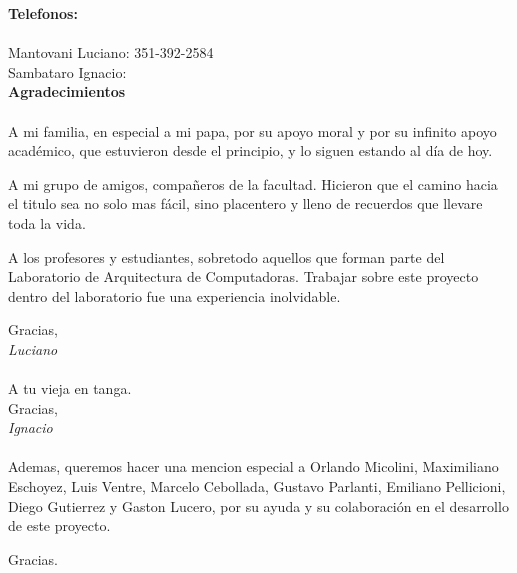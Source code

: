 \documentclass[a4paper]{report}
\begin{document}
\clearpage

\noindent
\textbf{\large{Telefonos:}} \\ \\
Mantovani Luciano: 351-392-2584 \\
Sambataro Ignacio: \\

\clearpage
\noindent
\textbf{\large{Agradecimientos}} \\ \\
A mi familia, en especial a mi papa, por su apoyo moral y por su infinito apoyo académico, que estuvieron desde el principio, y lo siguen estando al día de hoy.

A mi grupo de amigos, compañeros de la facultad. Hicieron que el camino hacia el titulo sea no solo mas fácil, sino placentero y lleno de recuerdos que llevare toda la vida.

A los profesores y estudiantes, sobretodo aquellos que forman parte del Laboratorio de Arquitectura de Computadoras. Trabajar sobre este proyecto dentro del laboratorio fue una experiencia inolvidable.



Gracias, \\

\textit{Luciano} \\ \\

A tu vieja en tanga. \\

Gracias, \\

\textit{Ignacio} \\ \\

Ademas, queremos hacer una mencion especial a Orlando Micolini, Maximiliano Eschoyez, Luis Ventre, Marcelo Cebollada, Gustavo Parlanti, Emiliano Pellicioni, Diego Gutierrez y Gaston Lucero, por su ayuda y su colaboración en el desarrollo de este proyecto.

Gracias.
\end{document}
